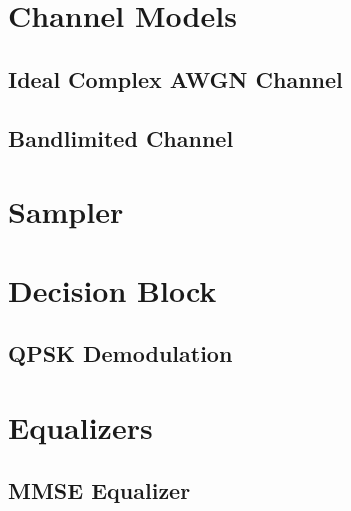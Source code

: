 \documentclass[]{article}
\begin{document}
\section{Channel Models}
\subsection{Ideal Complex AWGN Channel}
\label{app:awgn_channel}


\subsection{Bandlimited Channel}
\label{app:bandlimited}


\section{Sampler}
\label{app:sampler}


\section{Decision Block}
\label{app:dblocks}
\subsection{QPSK Demodulation}
\label{app:qpsk_demod}


\section{Equalizers}
\subsection{MMSE Equalizer}

\end{document}
